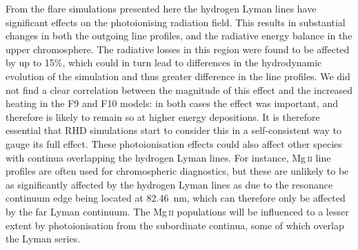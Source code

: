 From the flare simulations presented here the hydrogen Lyman lines have significant effects on the \Caii{} photoionising radiation field.
This results in substantial changes in both the outgoing \CaLine{} line profiles, and the radiative energy balance in the upper chromosphere.
The radiative losses in this region were found to be affected by up to 15\%, which could in turn lead to differences in the hydrodynamic evolution of the simulation and thus greater difference in the line profiles.
We did not find a clear correlation between the magnitude of this effect and the increased heating in the F9 and F10 models: in both cases the effect was important, and therefore is likely to remain so at higher energy depositions.
It is therefore essential that RHD simulations start to consider this in a self-consistent way to gauge its full effect.
These photoionisation effects could also affect other species with continua overlapping the hydrogen Lyman lines.
For instance, Mg\,\textsc{ii} line profiles are often used for chromospheric diagnostics, but these are unlikely to be as significantly affected by the hydrogen Lyman lines as \Caii{} due to the resonance continuum edge being located at \SI{82.46}{\nano\metre}, which can therefore only be affected by the far Lyman continuum.
The Mg\,\textsc{ii} populations will be influenced to a lesser extent by photoionisation from the subordinate continua, some of which overlap the Lyman series.


